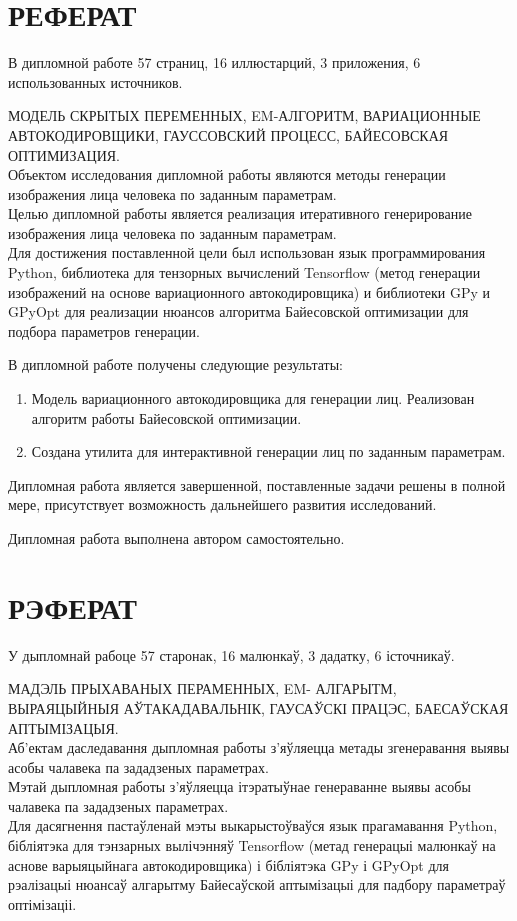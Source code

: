 \chapter*{\large РЕФЕРАТ}  
В дипломной работе 57 страниц, 16 иллюстарций, 3 приложения, 6 использованных источников.

\indent
 МОДЕЛЬ СКРЫТЫХ ПЕРЕМЕННЫХ, EM-АЛГОРИТМ, ВАРИАЦИОННЫЕ АВТОКОДИРОВЩИКИ, ГАУССОВСКИЙ ПРОЦЕСС, БАЙЕСОВСКАЯ ОПТИМИЗАЦИЯ. \\
\indent
Объектом исследования дипломной работы являются методы генерации изображения лица человека по заданным параметрам. \\
\indent
Целью дипломной работы является реализация итеративного генерирование изображения лица человека по заданным параметрам. \\
\indent
Для достижения поставленной цели был использован язык программирования Python, библиотека для тензорных вычислений Tensorflow (метод генерации изображений на основе вариационного автокодировщика) и библиотеки GPy и GPyOpt для реализации нюансов алгоритма Байесовской оптимизации для подбора параметров генерации.

\indent
В дипломной работе получены следующие результаты:
\begin{enumerate}
	\setlength{\itemindent}{2em}
	\setlength\itemsep{0.1em}
	\item Модель вариационного автокодировщика для генерации лиц. Реализован алгоритм работы Байесовской оптимизации.
	\item Создана утилита для интерактивной генерации лиц по заданным параметрам.
\end{enumerate}

Дипломная работа является завершенной, поставленные задачи решены в полной мере, присутствует возможность дальнейшего развития исследований.

Дипломная работа выполнена автором самостоятельно. 

\newpage
\chapter*{\large РЭФЕРАТ} 
У дыпломнай рабоце 57 старонак, 16 малюнкаў, 3 дадатку, 6 істочникаў.

\indent
МАДЭЛЬ ПРЫХАВАНЫХ ПЕРАМЕННЫХ, EM- АЛГАРЫТМ, ВЫРАЯЦЫЙНЫЯ АЎТАКАДАВАЛЬНІК, ГАУСАЎСКІ ПРАЦЭС, БАЕСАЎСКАЯ АПТЫМІЗАЦЫЯ. \\
\indent
Аб'ектам даследавання дыпломная работы з'яўляецца метады згенеравання выявы асобы чалавека па зададзеных параметрах. \\
\indent
Мэтай дыпломная работы з'яўляецца ітэратыўнае генераванне выявы асобы чалавека па зададзеных параметрах. \\
\indent
Для дасягнення пастаўленай мэты выкарыстоўваўся язык прагамавання Python, бібліятэка для тэнзарных вылічэнняў Tensorflow (метад генерацыі малюнкаў на аснове варыяцыйнага автокодировщика) і бібліятэка GPy і GPyOpt для рэалізацыі нюансаў алгарытму Байесаўской аптымізацыі для падбору параметраў оптімізаціі.

